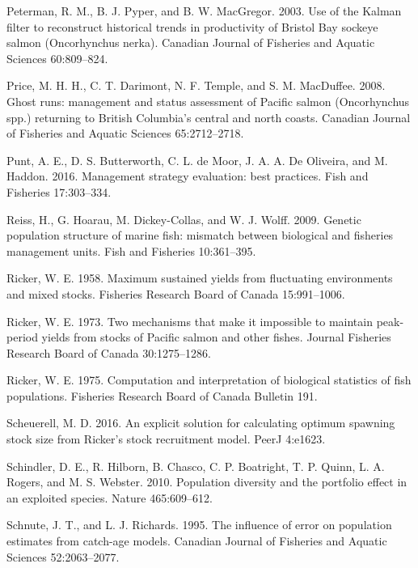 \documentclass[11pt]{book}
\begin{document}
{{{\hypertarget{ref-Peterman2003}{}
Peterman, R. M., B. J. Pyper, and B. W. MacGregor. 2003. Use of the Kalman filter to reconstruct historical trends in productivity of Bristol Bay sockeye salmon (Oncorhynchus nerka). Canadian Journal of Fisheries and Aquatic Sciences 60:809--824.

\hypertarget{ref-Price2008}{}
Price, M. H. H., C. T. Darimont, N. F. Temple, and S. M. MacDuffee. 2008. Ghost runs: management and status assessment of Pacific salmon (Oncorhynchus spp.) returning to British Columbia's central and north coasts. Canadian Journal of Fisheries and Aquatic Sciences 65:2712--2718.

\hypertarget{ref-Punt2016}{}
Punt, A. E., D. S. Butterworth, C. L. de Moor, J. A. A. De Oliveira, and M. Haddon. 2016. Management strategy evaluation: best practices. Fish and Fisheries 17:303--334.

\hypertarget{ref-Reiss2009}{}
Reiss, H., G. Hoarau, M. Dickey-Collas, and W. J. Wolff. 2009. Genetic population structure of marine fish: mismatch between biological and fisheries management units. Fish and Fisheries 10:361--395.

\hypertarget{ref-Ricker1958}{}
Ricker, W. E. 1958. Maximum sustained yields from fluctuating environments and mixed stocks. Fisheries Research Board of Canada 15:991--1006.

\hypertarget{ref-Ricker1973}{}
Ricker, W. E. 1973. Two mechanisms that make it impossible to maintain peak-period yields from stocks of Pacific salmon and other fishes. Journal Fisheries Research Board of Canada 30:1275--1286.

\hypertarget{ref-Ricker1975}{}
Ricker, W. E. 1975. Computation and interpretation of biological statistics of fish populations. Fisheries Research Board of Canada Bulletin 191.

\hypertarget{ref-Scheuerell2016}{}
Scheuerell, M. D. 2016. An explicit solution for calculating optimum spawning stock size from Ricker's stock recruitment model. PeerJ 4:e1623.

\hypertarget{ref-Schindler2010}{}
Schindler, D. E., R. Hilborn, B. Chasco, C. P. Boatright, T. P. Quinn, L. A. Rogers, and M. S. Webster. 2010. Population diversity and the portfolio effect in an exploited species. Nature 465:609--612.

\hypertarget{ref-Schnute1995}{}
Schnute, J. T., and L. J. Richards. 1995. The influence of error on population estimates from catch-age models. Canadian Journal of Fisheries and Aquatic Sciences 52:2063--2077.

}}}
\end{document}
